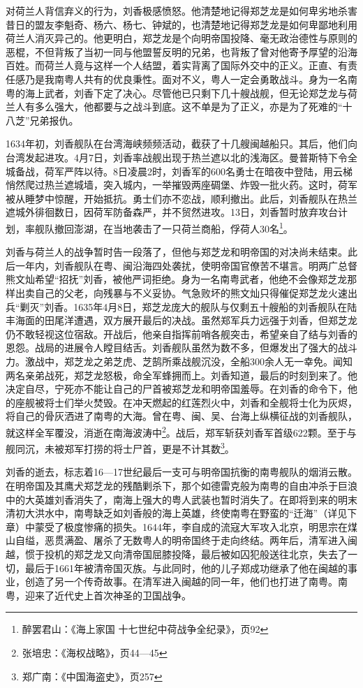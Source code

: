 对荷兰人背信弃义的行为，刘香极感愤怒。他清楚地记得郑芝龙是如何卑劣地杀害昔日的盟友李魁奇、杨六、杨七、钟斌的，也清楚地记得郑芝龙是如何卑鄙地利用荷兰人消灭异己的。他更明白，郑芝龙是个向明帝国投降、毫无政治德性与原则的恶棍，不但背叛了当初一同与他盟誓反明的兄弟，也背叛了曾对他寄予厚望的沿海百姓。而荷兰人竟与这样一个人结盟，着实背离了国际外交中的正义。正直、有责任感乃是我南粤人共有的优良秉性。面对不义，粤人一定会勇敢战斗。身为一名南粤的海上武者，刘香下定了决心。尽管他已只剩下几十艘战舰，但无论郑芝龙与荷兰人有多么强大，他都要与之战斗到底。这不单是为了正义，亦是为了死难的“十八芝”兄弟报仇。

1634年初，刘香舰队在台湾海峡频频活动，截获了十几艘闽越船只。其后，他们向台湾发起进攻。4月7日，刘香率战舰出现于热兰遮以北的浅海区。曼普斯特下令全城备战，荷军严阵以待。8日凌晨2时，刘香军的600名勇士在暗夜中登陆，用云梯悄然爬过热兰遮城墙，突入城内，一举摧毁两座碉堡、炸毁一批火药。这时，荷军被从睡梦中惊醒，开始抵抗。勇士们亦不恋战，顺利撤出。此后，刘香舰队在热兰遮城外徘徊数日，因荷军防备森严，并不贸然进攻。13日，刘香暂时放弃攻台计划，率舰队撤回澎湖，在当地袭击了一只荷兰商船，俘荷人30名\footnote{醉罢君山：《海上家国 十七世纪中荷战争全纪录》，页92}。

刘香与荷兰人的战争暂时告一段落了，但他与郑芝龙和明帝国的对决尚未结束。此后一年内，刘香舰队在粤、闽沿海四处袭扰，使明帝国官僚苦不堪言。明两广总督熊文灿希望“招抚”刘香，被他严词拒绝。身为一名南粤武者，他绝不会像郑芝龙那样出卖自己的父老，向残暴与不义妥协。气急败坏的熊文灿只得催促郑芝龙火速出兵“剿灭”刘香。1635年4月8日，郑芝龙庞大的舰队与仅剩五十艘船的刘香舰队在陆丰海面的田尾洋遭遇，双方展开最后的决战。虽然郑军兵力远强于刘香，但郑芝龙仍不敢轻视这位宿敌。开战后，他亲自指挥前哨各舰突击，希望亲自了结与刘香的恩怨。战局的进展令人瞠目结舌。刘香舰队虽然为数不多，但爆发出了强大的战斗力。激战中，郑芝龙之弟芝虎、芝鹄所乘战舰沉没，全船300余人无一幸免。闻知两名亲弟战死，郑芝龙怒极，命全军蜂拥而上。刘香知道，最后的时刻到来了。他决定自尽，宁死亦不能让自己的尸首被郑芝龙和明帝国羞辱。在刘香的命令下，他的座舰被将士们举火焚毁。在冲天燃起的红莲烈火中，刘香和全舰将士化为灰烬，将自己的骨灰洒进了南粤的大海。曾在粤、闽、吴、台海上纵横征战的刘香舰队，就这样全军覆没，消逝在南海波涛中\footnote{张培忠：《海权战略》，页44—45}。战后，郑军斩获刘香军首级622颗。至于与舰同沉，未被郑军打捞的将士尸首，更是不计其数\footnote{郑广南：《中国海盗史》，页257}。

刘香的逝去，标志着16—17世纪最后一支可与明帝国抗衡的南粤舰队的烟消云散。在明帝国及其鹰犬郑芝龙的残酷剿杀下，那个如德雷克般为南粤的自由冲杀于巨浪中的大英雄刘香消失了，南海上强大的粤人武装也暂时消失了。在即将到来的明末清初大洪水中，南粤缺乏如刘香般的海上英雄，终使南粤在野蛮的“迁海”（详见下章）中蒙受了极度惨痛的损失。1644年，李自成的流寇大军攻入北京，明思宗在煤山自缢，恶贯满盈、屠杀了无数粤人的明帝国终于走向终结。两年后，清军进入闽越，惯于投机的郑芝龙又向清帝国屈膝投降，最后被如囚犯般送往北京，失去了一切，最后于1661年被清帝国灭族。与此同时，他的儿子郑成功继承了他在闽越的事业，创造了另一个传奇故事。在清军进入闽越的同一年，他们也打进了南粤。南粤，迎来了近代史上首次神圣的卫国战争。









